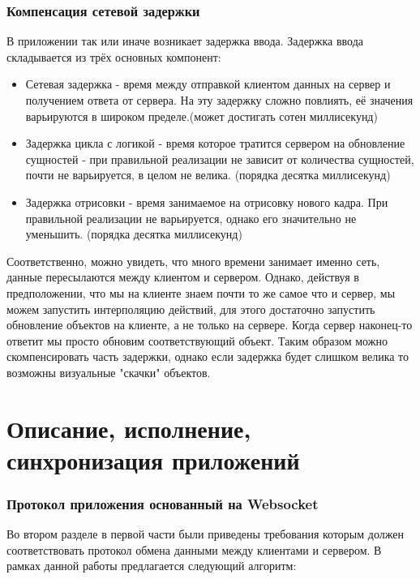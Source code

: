 \documentclass[a4paper,14pt, openany]{book}
\begin{document}
\subsection{Компенсация сетевой задержки}

В приложении так или иначе возникает задержка ввода. Задержка ввода складывается из трёх основных компонент:

\begin{itemize}
   \item Сетевая задержка - время между отправкой клиентом данных на сервер и получением ответа от сервера. На эту задержку сложно повлиять, её значения варьируются в широком пределе.(может достигать сотен миллисекунд)
   \item Задержка цикла с логикой - время которое тратится сервером на обновление сущностей - при правильной реализации не зависит от количества сущностей, почти не варьируется, в целом не велика. (порядка десятка миллисекунд)
   \item Задержка отрисовки - время занимаемое на отрисовку нового кадра. При правильной реализации не варьируется, однако его значительно не уменьшить. (порядка десятка миллисекунд)
\end{itemize}

Соответственно, можно увидеть, что много времени занимает именно сеть, данные пересылаются между клиентом и сервером. Однако, действуя в предположении, что мы на клиенте знаем почти то же самое что и сервер, мы можем запустить интерполяцию действий, для этого достаточно запустить обновление объектов на клиенте, а не только на сервере. Когда сервер наконец-то ответит мы просто обновим соответствующий объект. Таким образом можно скомпенсировать часть задержки, однако если задержка будет слишком велика то возможны визуальные "скачки" объектов. 

\chapter {Описание, исполнение, синхронизация приложений}



\subsection{Протокол приложения основанный на Websocket}

Во втором разделе в первой части были приведены требования которым должен соответствовать протокол обмена данными между клиентами и сервером. В рамках данной работы предлагается следующий алгоритм:
\end{document}
